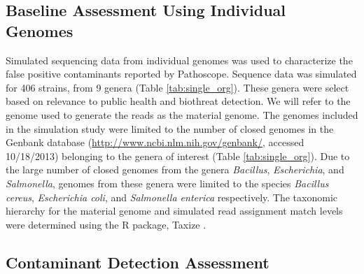 \documentclass[fleqn,10pt,lineno]{wlpeerj}\usepackage[]{graphicx}\usepackage[]{color}
\begin{document}
\subsection*{Baseline Assessment Using Individual Genomes}
Simulated sequencing data from individual genomes was used to characterize the false positive contaminants reported by Pathoscope.
Sequence data was simulated for 406 strains, from 9 genera (Table \ref{tab:single_org}).
These genera were select based on relevance to public health and biothreat detection.
We will refer to the genome used to generate the reads as the material genome.
The genomes included in the simulation study were limited to the number of closed genomes in the Genbank database (\url{http://www.ncbi.nlm.nih.gov/genbank/}, accessed 10/18/2013) belonging to the genera of interest (Table \ref{tab:single_org}).
Due to the large number of closed genomes from the genera \textit{Bacillus}, \textit{Escherichia}, and \textit{Salmonella}, genomes from these genera were limited to the species \textit{Bacillus cereus}, \textit{Escherichia coli}, and \textit{Salmonella enterica} respectively.
The taxonomic hierarchy for the material genome and simulated read assignment match levels were determined using the R package, Taxize \citep{TaxizeArticle,TaxizeManual}.

\subsection*{Contaminant Detection Assessment}
\end{document}
